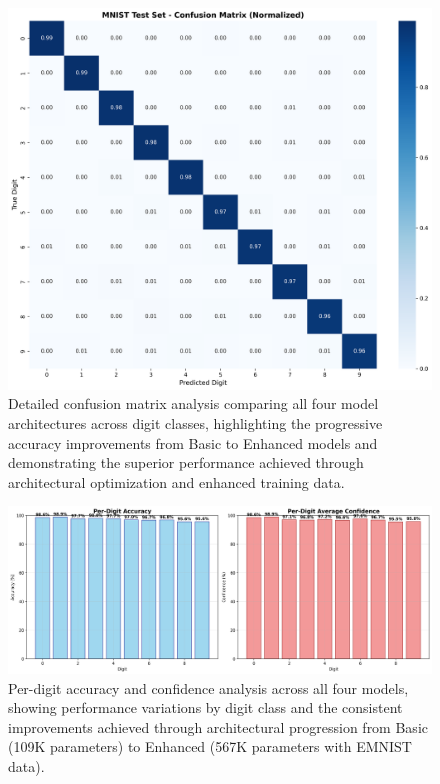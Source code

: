 \documentclass[11pt,a4paper]{report}
\begin{document}
\begin{figure}[H]
\centering
\includegraphics[width=\textwidth]{confusion_matrix.png}
\caption{Detailed confusion matrix analysis comparing all four model architectures across digit classes, highlighting the progressive accuracy improvements from Basic to Enhanced models and demonstrating the superior performance achieved through architectural optimization and enhanced training data.}
\label{fig:digit_confusion}
\end{figure}

\begin{figure}[H]
\centering
\includegraphics[width=\textwidth]{per_digit_performance.png}
\caption{Per-digit accuracy and confidence analysis across all four models, showing performance variations by digit class and the consistent improvements achieved through architectural progression from Basic (109K parameters) to Enhanced (567K parameters with EMNIST data).}
\label{fig:digit_per_digit}
\end{figure}
\end{document}
